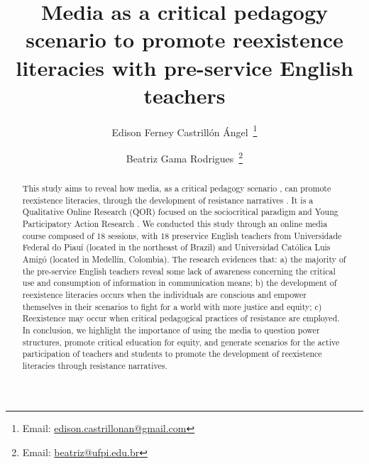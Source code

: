 \documentclass[english]{textolivre}
\title{Media as a critical pedagogy scenario to promote reexistence literacies with pre-service English teachers}
\author[1,2]{Edison Ferney Castrillón Ángel~\orcid{0000-0001-9237-1084}\thanks{Email: \href{mailto:edison.castrillonan@gmail.com}{edison.castrillonan@gmail.com}}}
\author[1]{Beatriz Gama Rodrigues~\orcid{0000-0001-8802-8320}\thanks{Email: \href{mailto:beatriz@ufpi.edu.br}{beatriz@ufpi.edu.br}}}
\affil[1]{Universidade Federal do Piauí, Letras, Teresina, PI, Brasil.}
\affil[2]{Universidad Católica Luís Amigó, Medellín, Colômbia.}
\begin{document}
\maketitle

\begin{polyabstract}
\begin{abstract}
This study aims to reveal how media, as a critical pedagogy scenario \cite{apple1990,mclaren2007critical}, can promote reexistence literacies, through the development of resistance narratives \cite{kleiman2016,silva-souza2009letramentos}. It is a Qualitative Online Research (QOR) \cite{denzin2005} focused on the sociocritical paradigm \cite{freire1970} and Young Participatory Action Research \cite{mirra2015doing}. We conducted this study through an online media course composed of 18 sessions, with 18 preservice English teachers from Universidade Federal do Piauí (located in the northeast of Brazil) and Universidad Católica Luis Amigó (located in Medellín, Colombia). The research evidences that: a) the majority of the pre-service English teachers reveal some lack of awareness concerning the critical use and consumption of information in communication means; b) the development of reexistence literacies occurs when the individuals are conscious and empower themselves in their scenarios to fight for a world with more justice and equity; c) Reexistence may occur when critical pedagogical practices of resistance are employed. In conclusion, we highlight the importance of using the media to question power structures, promote critical education for equity, and generate scenarios for the active participation of teachers and students to promote the development of reexistence literacies through resistance narratives.

\end{abstract}


\end{polyabstract}
\end{document}
